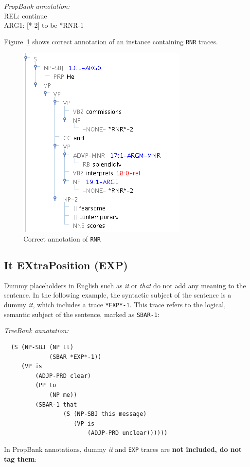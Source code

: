 \documentclass[11pt]{report}
\begin{document}
\textit{PropBank annotation:}\\
REL:   continue\\
ARG1: [*-2] to be *RNR-1

Figure~\ref{fig: RNR} shows correct annotation of an instance containing \texttt{RNR} traces. 

\begin{figure}[htbp]
\centering
\includegraphics[scale=0.6]{img/RNR.png}
\caption{Correct annotation of \texttt{RNR}}
\label{fig: RNR}
\end{figure}

\subsection{It EXtraPosition (EXP)}

Dummy placeholders in English such as \textit{it} or \textit{that} do not add any meaning to the sentence.  In the following example, the syntactic subject of the sentence is a dummy \textit{it}, which includes a trace \texttt{*EXP*-1}. This trace refers to the logical, semantic subject of the sentence, marked as \texttt{SBAR-1}:

\textit{TreeBank annotation:}
 \begin{verbatim}
  (S (NP-SBJ (NP It)
             (SBAR *EXP*-1))
     (VP is
         (ADJP-PRD clear)
         (PP to
             (NP me))
         (SBAR-1 that
                 (S (NP-SBJ this message)
                    (VP is
                        (ADJP-PRD unclear))))))
\end{verbatim}
 
In PropBank annotations, dummy \textit{it} and \texttt{EXP} traces are \textbf{not included, do not tag them}:
\end{document}
